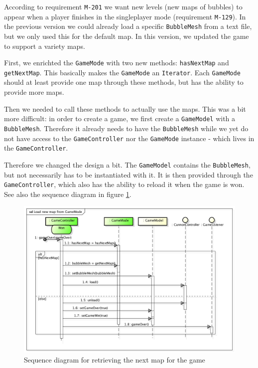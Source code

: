 \documentclass[a4paper]{article}
\begin{document}
According to requirement \texttt{M-201} we want new levels (new maps of bubbles) to appear when a player finishes in the singleplayer mode (requirement \texttt{M-129}). In the previous version we could already load a specific \texttt{BubbleMesh} from a text file, but we only used this for the default map. In this version, we updated the game to support a variety maps.

\par{} First, we enrichted the \texttt{GameMode} with two new methods: \texttt{hasNextMap} and \texttt{getNextMap}. This basically makes the \texttt{GameMode} an \texttt{Iterator}. Each \texttt{GameMode} should at least provide one map through these methods, but has the ability to provide more maps.

\par{} Then we needed to call these methods to actually use the maps. This was a bit more difficult: in order to create a game, we first create a \texttt{GameModel} with a \texttt{BubbleMesh}. Therefore it already needs to have the \texttt{BubbleMesh} while we yet do not have access to the \texttt{GameController} nor the \texttt{GameMode} instance - which lives in the \texttt{GameController}.

\par{} Therefore we changed the design a bit. The \texttt{GameModel} contains the \texttt{BubbleMesh}, but not necessarily has to be instantiated with it. It is then provided through the \texttt{GameController}, which also has the ability to reload it when the game is won. See also the sequence diagram in figure \ref{fig:GameModeMap}.

\begin{figure}[H]
	\centering
	\includegraphics[scale=0.4]{GameModeMap.png}
    \caption{Sequence diagram for retrieving the next map for the game}
    \label{fig:GameModeMap}
\end{figure}
\end{document}
